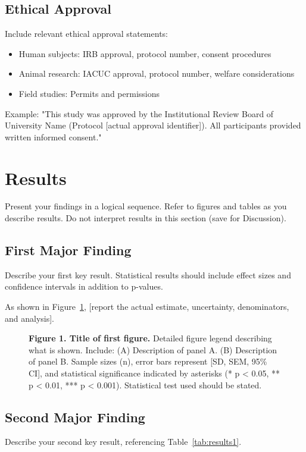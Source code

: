 \documentclass[10pt,letterpaper]{article}
\begin{document}
\subsection*{Ethical Approval}
Include relevant ethical approval statements:
\begin{itemize}
    \item Human subjects: IRB approval, protocol number, consent procedures
    \item Animal research: IACUC approval, protocol number, welfare considerations
    \item Field studies: Permits and permissions
\end{itemize}

Example: "This study was approved by the Institutional Review Board of University Name (Protocol [actual approval identifier]). All participants provided written informed consent."

\section*{Results}

Present your findings in a logical sequence. Refer to figures and tables as you describe results. Do not interpret results in this section (save for Discussion).

\subsection*{First Major Finding}
Describe your first key result. Statistical results should include effect sizes and confidence intervals in addition to p-values.

As shown in Figure~\ref{fig:results1}, [report the actual estimate, uncertainty, denominators, and analysis].

\begin{figure}[!ht]
\centering
\caption{{\bf Figure 1. Title of first figure.}
Detailed figure legend describing what is shown. Include: (A) Description of panel A. (B) Description of panel B. Sample sizes (n), error bars represent [SD, SEM, 95\% CI], and statistical significance indicated by asterisks (* p < 0.05, ** p < 0.01, *** p < 0.001). Statistical test used should be stated.}
\label{fig:results1}
\end{figure}

\subsection*{Second Major Finding}
Describe your second key result, referencing Table~\ref{tab:results1}.
\end{document}
